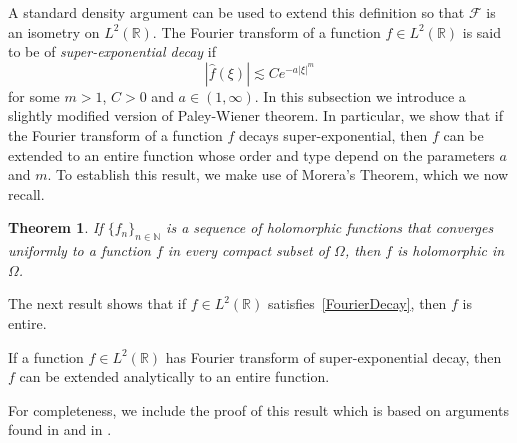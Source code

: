 \documentclass[graybox]{svmult}
\newcommand{\R}{\mathbb{R}}
\newcommand{\N}{\mathbb{N}}
\newtheorem{mainthm}{Theorem}
\begin{document}
A standard density argument can be used to extend this definition so that  $\mathcal{F}$ is an isometry on $L^2(\R)$. The Fourier transform of a function $f \in L^2(\R)$ is said to be of \emph{super-exponential decay} if
\begin{equation}\label{FourierDecay}
    |\hat{f}(\xi)| \lesssim Ce^{-a|\xi|^m}    
\end{equation}
for some $m>1$, $C>0$ and $a \in (1,\infty)$. In this subsection we introduce a slightly modified version of Paley-Wiener theorem. In particular, we show that if the Fourier transform of a function $f$ decays super-exponential, then $f$ can 
be extended to an entire function whose order and type depend on the parameters $a$ and $m$. To establish this result, we make use of Morera’s Theorem, which we now recall. 
\begin{mainthm}\cite[Theorem 5.2]{stein2010complex}\label{Morera}
 If $\{ f_n \}_{n \in \N}$ is a sequence of holomorphic functions that converges uniformly to a function $f$ in every compact subset of $\Omega$, then $f$ is holomorphic in $\Omega$.
\end{mainthm}

The next result shows that if $f \in L^2(\R)$ satisfies~\eqref{FourierDecay}, then $f$ is entire.
\begin{lemma}\label{entire}
    If a function $f \in L^2(\R)$ has Fourier transform of super-exponential decay, then $f$ can be extended analytically to an entire function.
\end{lemma}
For completeness, we include the proof of this result which is based on arguments found in \cite[Chapter 3, Theorem 4.1]{stein1971introduction} and in \cite[Chapter 4, Problem 1]{stein2010complex}.\\
\end{document}
